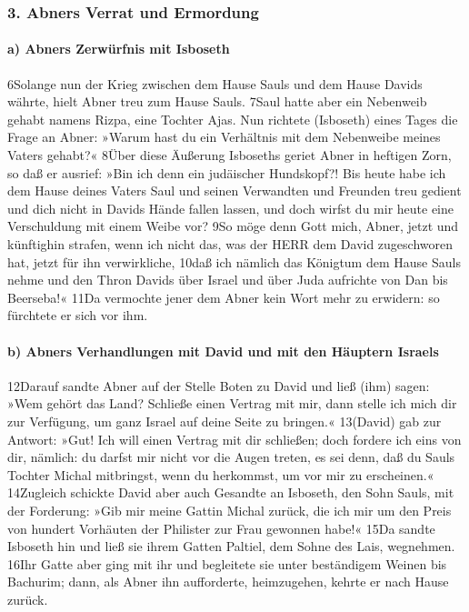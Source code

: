 \hypertarget{abners-verrat-und-ermordung}{%
\subsubsection{3. Abners Verrat und
Ermordung}\label{abners-verrat-und-ermordung}}

\hypertarget{a-abners-zerwuxfcrfnis-mit-isboseth}{%
\paragraph{a) Abners Zerwürfnis mit
Isboseth}\label{a-abners-zerwuxfcrfnis-mit-isboseth}}

6Solange nun der Krieg zwischen dem Hause Sauls und dem Hause Davids
währte, hielt Abner treu zum Hause Sauls. 7Saul hatte aber ein Nebenweib
gehabt namens Rizpa, eine Tochter Ajas. Nun richtete (Isboseth) eines
Tages die Frage an Abner: »Warum hast du ein Verhältnis mit dem
Nebenweibe meines Vaters gehabt?« 8Über diese Äußerung Isboseths geriet
Abner in heftigen Zorn, so daß er ausrief: »Bin ich denn ein judäischer
Hundskopf?! Bis heute habe ich dem Hause deines Vaters Saul und seinen
Verwandten und Freunden treu gedient und dich nicht in Davids Hände
fallen lassen, und doch wirfst du mir heute eine Verschuldung mit einem
Weibe vor? 9So möge denn Gott mich, Abner, jetzt und künftighin strafen,
wenn ich nicht das, was der HERR dem David zugeschworen hat, jetzt für
ihn verwirkliche, 10daß ich nämlich das Königtum dem Hause Sauls nehme
und den Thron Davids über Israel und über Juda aufrichte von Dan bis
Beerseba!« 11Da vermochte jener dem Abner kein Wort mehr zu erwidern: so
fürchtete er sich vor ihm.

\hypertarget{b-abners-verhandlungen-mit-david-und-mit-den-huxe4uptern-israels}{%
\paragraph{b) Abners Verhandlungen mit David und mit den Häuptern
Israels}\label{b-abners-verhandlungen-mit-david-und-mit-den-huxe4uptern-israels}}

12Darauf sandte Abner auf der Stelle Boten zu David und ließ (ihm)
sagen: »Wem gehört das Land? Schließe einen Vertrag mit mir, dann stelle
ich mich dir zur Verfügung, um ganz Israel auf deine Seite zu bringen.«
13(David) gab zur Antwort: »Gut! Ich will einen Vertrag mit dir
schließen; doch fordere ich eins von dir, nämlich: du darfst mir nicht
vor die Augen treten, es sei denn, daß du Sauls Tochter Michal
mitbringst, wenn du herkommst, um vor mir zu erscheinen.« 14Zugleich
schickte David aber auch Gesandte an Isboseth, den Sohn Sauls, mit der
Forderung: »Gib mir meine Gattin Michal zurück, die ich mir um den Preis
von hundert Vorhäuten der Philister zur Frau gewonnen habe!« 15Da sandte
Isboseth hin und ließ sie ihrem Gatten Paltiel, dem Sohne des Lais,
wegnehmen. 16Ihr Gatte aber ging mit ihr und begleitete sie unter
beständigem Weinen bis Bachurim; dann, als Abner ihn aufforderte,
heimzugehen, kehrte er nach Hause zurück.

